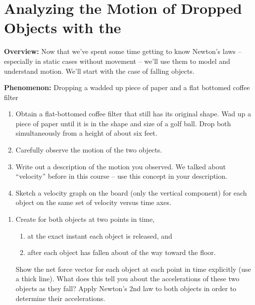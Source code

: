 \section[Analyzing the Motion of Dropped Objects]{Analyzing the Motion of Dropped Objects with the \FModel{}}
\label{act8.2.1}

\begin{overview}
	\textbf{Overview:} Now that we've spent some time getting to know Newton's laws -- especially in static cases without movement -- we'll use them to model and understand motion. We'll start with the case of falling objects.
\end{overview}

\noindent\textbf{Phenomenon:} Dropping a wadded up piece of paper and a flat bottomed coffee filter

\begin{benumerate}
	
	\begin{enumerate}
		\item Obtain a flat-bottomed coffee filter that still has its original shape. Wad up a piece of paper until it is in the shape and size of a golf ball. Drop both simultaneously from a height of about six feet.
		
		\item Carefully observe the motion of the two objects.
		
		\item Write out a description of the motion you observed. We talked about ``velocity'' before in this course -- use this concept in your description.
		
		\item Sketch a velocity graph on the board (only the vertical component) for each object on the same set of velocity versus time axes.
	\end{enumerate}

\WCD

	
	\begin{enumerate}
		\item Create \forcediags{} for both objects at two points in time, 
		\begin{enumerate}
			\item at the exact instant each object is released, and
			\item after each object has fallen about  of the way toward the floor.
		\end{enumerate}
		Show the net force vector for each object at each point in time explicitly (use a thick line). What does this tell you about the accelerations of these two objects as they fall? Apply Newton's 2nd law to both objects in order to determine their accelerations.
		

\end{enumerate}
\end{benumerate}
